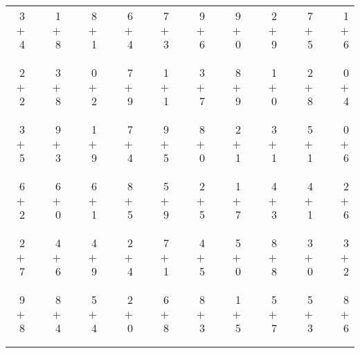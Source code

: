 \documentclass[12pt, letterpaper]{article}
\begin{document}
\begin{tabular}{rrrrrrrrrrrrrrrrrrr}
3 & & 1 & & 8 & & 6 & & 7 & & 9 & & 9 & & 2 & & 7 & & 1\\
$+$ 4 & & $+$ 8 & & $+$ 1 & & $+$ 4 & & $+$ 3 & & $+$ 6 & & $+$ 0 & & $+$ 9 & & $+$ 5 & & $+$ 6\\
\cline{1-1} \cline{3-3} \cline{5-5} \cline{7-7} \cline{9-9} \cline{11-11} \cline{13-13} \cline{15-15} \cline{17-17} \cline{19-19} \\ \\
2 & & 3 & & 0 & & 7 & & 1 & & 3 & & 8 & & 1 & & 2 & & 0\\
$+$ 2 & & $+$ 8 & & $+$ 2 & & $+$ 9 & & $+$ 1 & & $+$ 7 & & $+$ 9 & & $+$ 0 & & $+$ 8 & & $+$ 4\\
\cline{1-1} \cline{3-3} \cline{5-5} \cline{7-7} \cline{9-9} \cline{11-11} \cline{13-13} \cline{15-15} \cline{17-17} \cline{19-19} \\ \\
3 & & 9 & & 1 & & 7 & & 9 & & 8 & & 2 & & 3 & & 5 & & 0\\
$+$ 5 & & $+$ 3 & & $+$ 9 & & $+$ 4 & & $+$ 5 & & $+$ 0 & & $+$ 1 & & $+$ 1 & & $+$ 1 & & $+$ 6\\
\cline{1-1} \cline{3-3} \cline{5-5} \cline{7-7} \cline{9-9} \cline{11-11} \cline{13-13} \cline{15-15} \cline{17-17} \cline{19-19} \\ \\
6 & & 6 & & 6 & & 8 & & 5 & & 2 & & 1 & & 4 & & 4 & & 2\\
$+$ 2 & & $+$ 0 & & $+$ 1 & & $+$ 5 & & $+$ 9 & & $+$ 5 & & $+$ 7 & & $+$ 3 & & $+$ 1 & & $+$ 6\\
\cline{1-1} \cline{3-3} \cline{5-5} \cline{7-7} \cline{9-9} \cline{11-11} \cline{13-13} \cline{15-15} \cline{17-17} \cline{19-19} \\ \\
2 & & 4 & & 4 & & 2 & & 7 & & 4 & & 5 & & 8 & & 3 & & 3\\
$+$ 7 & & $+$ 6 & & $+$ 9 & & $+$ 4 & & $+$ 1 & & $+$ 5 & & $+$ 0 & & $+$ 8 & & $+$ 0 & & $+$ 2\\
\cline{1-1} \cline{3-3} \cline{5-5} \cline{7-7} \cline{9-9} \cline{11-11} \cline{13-13} \cline{15-15} \cline{17-17} \cline{19-19} \\ \\
9 & & 8 & & 5 & & 2 & & 6 & & 8 & & 1 & & 5 & & 5 & & 8\\
$+$ 8 & & $+$ 4 & & $+$ 4 & & $+$ 0 & & $+$ 8 & & $+$ 3 & & $+$ 5 & & $+$ 7 & & $+$ 3 & & $+$ 6\\
\cline{1-1} \cline{3-3} \cline{5-5} \cline{7-7} \cline{9-9} \cline{11-11} \cline{13-13} \cline{15-15} \cline{17-17} \cline{19-19} \\ \\

\end{tabular}
\end{document}
